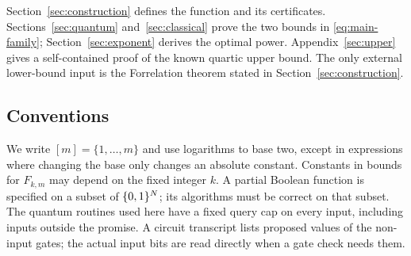 Section~\ref{sec:construction} defines the function and its certificates.
Sections~\ref{sec:quantum} and~\ref{sec:classical} prove the two bounds in
\eqref{eq:main-family}; Section~\ref{sec:exponent} derives the optimal
power. Appendix~\ref{sec:upper} gives a self-contained proof of the known
quartic upper bound. The only external lower-bound input is the
Forrelation theorem stated in Section~\ref{sec:construction}.

\subsection{Conventions}

We write $[m]=\{1,\ldots,m\}$ and use logarithms to base two, except in
expressions where changing the base only changes an absolute constant.
Constants in bounds for $F_{k,m}$ may depend on the fixed integer $k$.
A partial Boolean function is specified on a subset of $\{0,1\}^N$;
its algorithms must be correct on that subset. The quantum routines used
here have a fixed query cap on every input, including inputs outside the
promise. A circuit transcript lists proposed values of the non-input
gates; the actual input bits are read directly when a gate check needs them.

